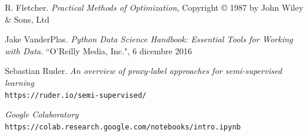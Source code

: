 \documentclass[12pt,italian]{report}
\begin{document}
\begin{thebibliography}{9}
 	
  	R. Fletcher. \textit{Practical Methods of Optimization}, 
  	Copyright © 1987 by John Wiley \& Sons, Ltd
 	
 	Jake VanderPlas. 
 	\textit{Python Data Science Handbook: Essential Tools for Working with Data}. 
 	``O'Reilly Media, Inc.", 6 dicembre 2016

 	Sebastian Ruder. \textit{An overview of proxy-label approaches for semi-supervised learning}
 	\\\texttt{https://ruder.io/semi-supervised/}
 	
 	\textit{Google Colaboratory}
 	\\\texttt{https://colab.research.google.com/notebooks/intro.ipynb}
\end{thebibliography}

\cleardoublepage
\end{document}
